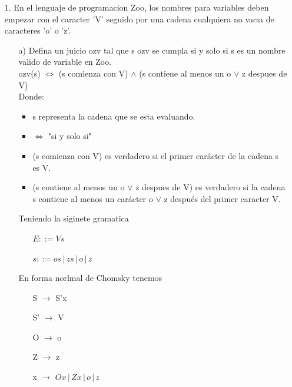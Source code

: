 \documentclass{article}
\begin{document}
    \begin{itemize}
        \item[1.] En el lenguaje de programacion Zoo, los nombres para variables deben empezar con el caracter ’V’ seguido por una cadena cualquiera no vacıa de caracteres ’o’ o ’z’.
            \begin{itemize}
                \item[a)]Defina un juicio ozv tal que s ozv se cumpla si y solo si s es un nombre valido de variable en Zoo.\\
                ozv(s) $\Leftrightarrow$ (s comienza con V) $\land$ (s contiene al menos un o $\lor$ z despues de V)\\
                Donde:\\
                \begin{itemize}
                    \item s representa la cadena que se esta evaluando.
                    \item $\Leftrightarrow$ "si y solo si"
                    \item (s comienza con V) es verdadero si el primer carácter de la cadena s es V.
                    \item (s contiene al menos un o $\lor$ z despues de V) es verdadero si la cadena s contiene al menos un carácter o $\lor$ z después del primer caracter V.
                \end{itemize}
                Teniendo la siginete gramatica
                \begin{center}
                    \begin{itemize}
                        \item[ ] $E ::= Vs$
                        \item[ ] $s ::= os \,|\, zs \,|\, o \,|\, z $  
                    \end{itemize}
                \end{center}

                En forma norlmal de Chomsky tenemos
                \begin{center}
                    \begin{itemize}
                        \item[ ] S $\rightarrow$ S'x 
                        \item[ ] S' $\rightarrow$ V
                        \item[ ] O $\rightarrow$ o
                        \item[ ] Z $\rightarrow$ z
                        \item[ ] x $\rightarrow$ $ Ox \,|\, Zx \,|\, o \,|\, z $
                    \end{itemize}
                \end{center}


\end{itemize}
\end{itemize}
\end{document}

